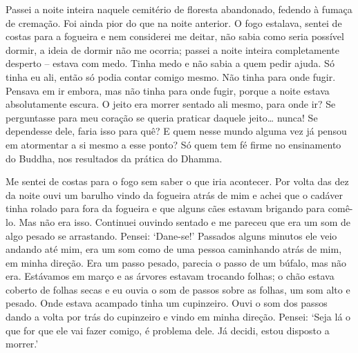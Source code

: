 Passei a noite inteira naquele cemitério de floresta abandonado, fedendo
à fumaça de cremação. Foi ainda pior do que na noite anterior. O fogo
estalava, sentei de costas para a fogueira e nem considerei me deitar,
não sabia como seria possível dormir, a ideia de dormir não me ocorria;
passei a noite inteira completamente desperto -- estava com medo. Tinha
medo e não sabia a quem pedir ajuda. Só tinha eu ali, então só podia
contar comigo mesmo. Não tinha para onde fugir. Pensava em ir embora,
mas não tinha para onde fugir, porque a noite estava absolutamente
escura. O jeito era morrer sentado ali mesmo, para onde ir? Se
perguntasse para meu coração se queria praticar daquele jeito\ldots{}
nunca! Se dependesse dele, faria isso para quê? E quem nesse mundo
alguma vez já pensou em atormentar a si mesmo a esse ponto? Só quem tem
fé firme no ensinamento do Buddha, nos resultados da prática do Dhamma.

Me sentei de costas para o fogo sem saber o que iria acontecer. Por
volta das dez da noite ouvi um barulho vindo da fogueira atrás de mim e
achei que o cadáver tinha rolado para fora da fogueira e que alguns cães
estavam brigando para comê-lo. Mas não era isso. Continuei ouvindo
sentado e me pareceu que era um som de algo pesado se arrastando.
Pensei: `Dane-se!' Passados alguns minutos ele veio andando até mim, era
um som como de uma pessoa caminhando atrás de mim, em minha direção. Era
um passo pesado, parecia o passo de um búfalo, mas não era. Estávamos em
março e as árvores estavam trocando folhas; o chão estava coberto de
folhas secas e eu ouvia o som de passos sobre as folhas, um som alto e
pesado. Onde estava acampado tinha um cupinzeiro. Ouvi o som dos passos
dando a volta por trás do cupinzeiro e vindo em minha direção. Pensei:
`Seja lá o que for que ele vai fazer comigo, é problema dele. Já decidi,
estou disposto a morrer.'

